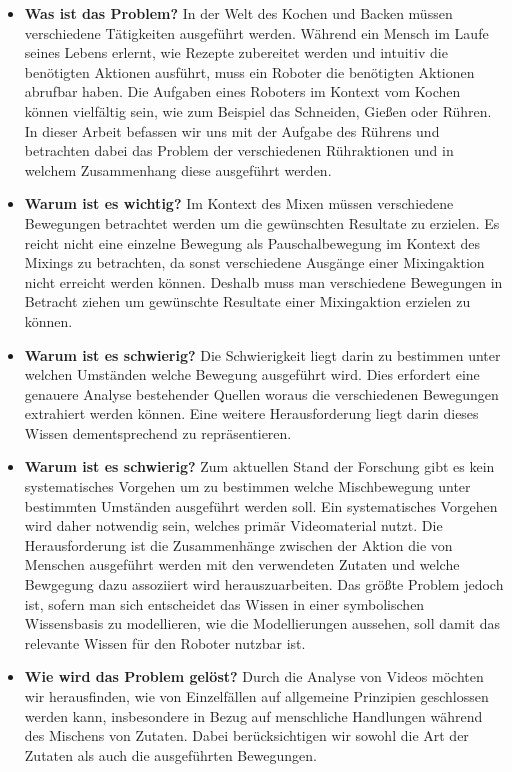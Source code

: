 \begin{itemize}
    \item \textbf{Was ist das Problem?} In der Welt des Kochen und Backen müssen verschiedene Tätigkeiten ausgeführt werden. Während ein Mensch im Laufe seines Lebens erlernt, wie Rezepte zubereitet werden und intuitiv die benötigten Aktionen ausführt, muss ein Roboter die benötigten Aktionen abrufbar haben. Die Aufgaben eines Roboters im Kontext vom Kochen können vielfältig sein, wie zum Beispiel das Schneiden, Gießen oder Rühren. In dieser Arbeit befassen wir uns mit der Aufgabe des Rührens und betrachten dabei das Problem der verschiedenen Rühraktionen und in welchem Zusammenhang diese ausgeführt werden. 
    \item \textbf{Warum ist es wichtig?} Im Kontext des Mixen müssen verschiedene Bewegungen betrachtet werden um die gewünschten Resultate zu erzielen. Es reicht nicht eine einzelne Bewegung als Pauschalbewegung im Kontext des Mixings zu betrachten, da sonst verschiedene Ausgänge einer Mixingaktion nicht erreicht werden können. Deshalb muss man verschiedene Bewegungen in Betracht ziehen um gewünschte Resultate einer Mixingaktion erzielen zu können.
    \item \textbf{Warum ist es schwierig?} Die Schwierigkeit liegt darin zu bestimmen unter welchen Umständen welche Bewegung ausgeführt wird. Dies erfordert eine genauere Analyse bestehender Quellen woraus die verschiedenen Bewegungen extrahiert werden können. Eine weitere Herausforderung liegt darin dieses Wissen dementsprechend zu repräsentieren.
    \item \textbf{Warum ist es schwierig?} Zum aktuellen Stand der Forschung gibt es kein systematisches Vorgehen um zu bestimmen welche Mischbewegung unter bestimmten Umständen ausgeführt werden soll.
    Ein systematisches Vorgehen wird daher notwendig sein, welches primär Videomaterial nutzt. Die Herausforderung ist die Zusammenhänge zwischen der Aktion die von Menschen ausgeführt werden mit 
    den verwendeten Zutaten und welche Bewgegung dazu assoziiert wird herauszuarbeiten. Das größte Problem jedoch ist, sofern man sich entscheidet das Wissen in einer symbolischen Wissensbasis
    zu modellieren, wie die Modellierungen aussehen, soll damit das relevante Wissen für den Roboter nutzbar ist.
    \item \textbf{Wie wird das Problem gelöst?}  Durch die Analyse von Videos möchten wir herausfinden, wie von Einzelfällen auf allgemeine Prinzipien geschlossen werden kann, insbesondere in Bezug auf menschliche Handlungen während des Mischens von Zutaten. Dabei berücksichtigen wir sowohl die Art der Zutaten als auch die ausgeführten Bewegungen.

\end{itemize}
